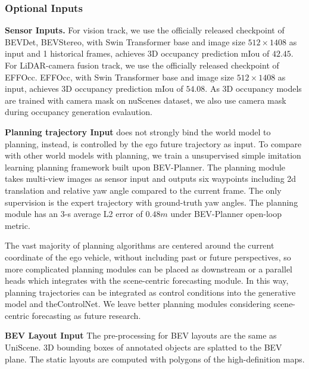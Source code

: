\subsubsection{Optional Inputs}
\textbf{Sensor Inputs.} For vision track, we use the officially released checkpoint of BEVDet\cite{bevdet}, BEVStereo, with Swin Transformer\cite{swin} base and image size $512\times1408$ as input and 1 historical frames, achieves 3D occupancy prediction mIou of $42.45$. For LiDAR-camera fusion track, we use the officially released checkpoint of EFFOcc\cite{effocc}. EFFOcc, with Swin Transformer\cite{swin} base and image size $512\times1408$ as input, achieves 3D occupancy prediction mIou of $54.08$. As 3D occupancy models are trained with camera mask on nuScenes dataset, we also use camera mask during occupancy generation evalaution.

\textbf{Planning trajectory Input}
\mtd{} does not strongly bind the world model to planning, instead, \mtd{} is controlled by the ego future trajectory as input. To compare with other world models with planning, we train a unsupervised simple imitation learning planning framework built upon BEV-Planner\cite{bev-planner}. The planning module takes multi-view images as sensor input and outputs six waypoints including 2d translation and relative yaw angle compared to the current frame. The only supervision is the expert trajectory with ground-truth yaw angles. The planning module has an 3-s average L2 error of $0.48m$ under BEV-Planner open-loop metric. 

The vast majority of planning algorithms are centered around the current coordinate of the ego vehicle, without including past or future perspectives, so more complicated planning modules can be placed as downstream or a parallel heads which integrates with the scene-centric forecasting module. In this way, planning trajectories can be integrated as control conditions into the generative model and theControlNet. We leave better planning modules considering scene-centric forecasting as future research.

\textbf{BEV Layout Input} The pre-processing for BEV layouts are the same as UniScene\cite{uniscene}. 3D bounding boxes of annotated objects are splatted to the BEV plane. The static layouts are computed with polygons of the high-definition maps. 


